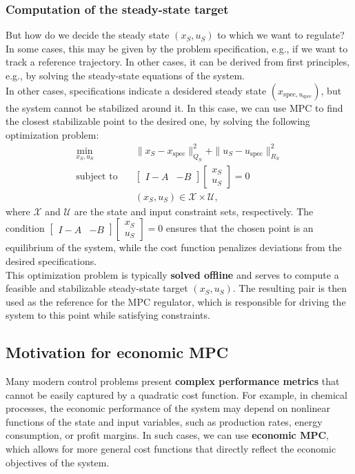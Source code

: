 \subsubsection{Computation of the steady-state target}
But how do we decide the steady state $(x_S,u_S)$ to which we want to regulate? In some cases, this may be given by the problem specification, e.g., if we want to track a reference trajectory. In other cases, it can be derived from first principles, e.g., by solving the steady-state equations of the system.\\
In other cases, specifications indicate a desidered steady state $(x_{\text{spec},u_{\text{spec}}})$, but the system cannot be stabilized around it. In this case, we can use MPC to find the closest stabilizable point to the desired one, by solving the following optimization problem:
\[
\begin{aligned}
\min_{x_S, u_S} \quad & \| x_S - x_{\text{spec}} \|_{Q_S}^2 + \| u_S - u_{\text{spec}} \|_{R_S}^2 \\
\text{subject to} \quad & \begin{bmatrix}I - A & -B\end{bmatrix}\begin{bmatrix}
x_S \\ u_S
\end{bmatrix} = 0\\
& (x_S, u_S) \in \mathcal{X} \times \mathcal{U},
\end{aligned}
\]
where $\mathcal{X}$ and $\mathcal{U}$ are the state and input constraint sets, respectively. The condition $\begin{bmatrix}I - A & -B\end{bmatrix}\begin{bmatrix}x_S \\ u_S
\end{bmatrix} = 0$ ensures that the chosen point is an equilibrium of the system, while the cost function penalizes deviations from the desired specifications.\\
This optimization problem is typically \textbf{solved offline} and serves to compute a feasible and stabilizable steady-state target $(x_S,u_S)$. The resulting pair is then used as the reference for the MPC regulator, which is responsible for driving the system to this point while satisfying constraints.
\subsection{Motivation for economic MPC}
Many modern control problems present \textbf{complex performance metrics} that cannot be easily captured by a quadratic cost function. For example, in chemical processes, the economic performance of the system may depend on nonlinear functions of the state and input variables, such as production rates, energy consumption, or profit margins. In such cases, we can use \textbf{economic MPC}, which allows for more general cost functions that directly reflect the economic objectives of the system.\\

